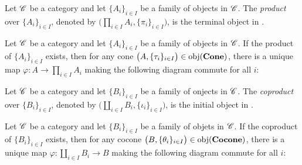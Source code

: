 \begin{definition}
	Let $\mathscr{C}$ be a category and let $\{A_i\}_{i \in I}$ be a family of objects in $\mathscr{C}$. The \emph{product} over $\{A_i\}_{i \in I}$, denoted by $\bigl( \prod_{i \in I}A_i, \{\pi_i\}_{i \in I} \bigr)$, is the terminal object in . 
\end{definition}

\begin{proposition}
	Let $\mathscr{C}$ be a category and let $\{A_i\}_{i \in I}$ be a family of objects in $\mathscr{C}$. If the product of $\{A_i\}_{i \in I}$ exists, then for any cone $\bigl( A, \{\tau_i\}_{i \in I} \bigr) \in \operatorname{obj}({\normalfont\textbf{Cone}})$, there is a unique map $\varphi:A \rightarrow \prod_{i \in I}A_i$ making the following diagram commute for all $i$:
	\begin{center}
	\end{center}
\end{proposition}

\begin{definition}
	Let $\mathscr{C}$ be a category and let $\{B_i\}_{i \in I}$ be a family of onjects in $\mathscr{C}$. The \emph{coproduct} over $\{B_i\}_{i \in I}$, denoted by $\bigl( \coprod_{i \in I}B_i, \{\iota_i\}_{i \in I} \bigr)$, is the initial object in .
\end{definition}

\begin{proposition}\label{prop:cocone-up}
	Let $\mathscr{C}$ be a category and let $\{B_i\}_{i \in I}$ be a family of objets in $\mathscr{C}$. If the coproduct of $\{B_i\}_{i \in I}$ exists, then for any cocone $\bigl( B, \{\theta_i\}_{i \in I} \bigr) \in \operatorname{obj}({\normalfont\textbf{Cocone}})$, there is a unique map $\varphi:\coprod_{i \in I} B_i \rightarrow B$ making the following diagram commute for all $i$:
	\begin{center}
	\end{center}
\end{proposition}

